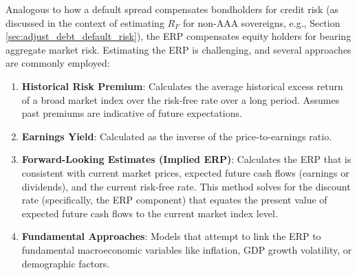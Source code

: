 Analogous to how a default spread compensates bondholders for credit risk (as discussed in the context of estimating \(R_F\) for non-AAA sovereigns, e.g., Section \ref{sec:adjust_debt_default_risk}), the ERP compensates equity holders for bearing aggregate market risk. Estimating the ERP is challenging, and several approaches are commonly employed:
\begin{enumerate}
    \item \textbf{Historical Risk Premium}: Calculates the average historical excess return of a broad market index over the risk-free rate over a long period. Assumes past premiums are indicative of future expectations.
    \item \textbf{Earnings Yield}: Calculated as the inverse of the price-to-earnings ratio.
    \item \textbf{Forward-Looking Estimates (Implied ERP)}: Calculates the ERP that is consistent with current market prices, expected future cash flows (earnings or dividends), and the current risk-free rate. This method solves for the discount rate (specifically, the ERP component) that equates the present value of expected future cash flows to the current market index level.
    \item \textbf{Fundamental Approaches}: Models that attempt to link the ERP to fundamental macroeconomic variables like inflation, GDP growth volatility, or demographic factors.
\end{enumerate}

